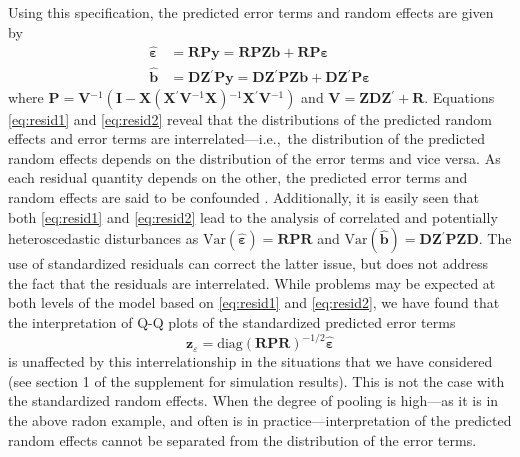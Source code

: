 \documentclass[12pt]{article} %
\newcommand{\al}[1]{{\color{red} #1}}
\newcommand{\inv}{\ensuremath{^{-1}}}
\newcommand{\trans}{\ensuremath{^\prime}}
\newcommand{\var}{\ensuremath{\mathrm{Var}}}
\begin{document}
Using this specification, the predicted error terms and random effects are given by 
%
\begin{align}
\widehat{\bm{\varepsilon}} &= \bm{RPy} = \bm{RPZb} + \bm{RP \varepsilon} \label{eq:resid1}\\
\widehat{\bm{b}} &= \bm{DZ}\trans \bm{Py} = \bm{DZ}\trans \bm{PZb} + \bm{DZ}\trans \bm{P \varepsilon} \label{eq:resid2}
\end{align}
%
where $\bm{P} = \bm{V}\inv( \bm{I} - \bm{X} (\bm{X}\trans \bm{V}\inv \bm{X})\inv \bm{X}\trans \bm{V}\inv)$ \al{and $\bm{V} = \bm{ZDZ}\trans + \bm{R}$}. 
\al{Equations \eqref{eq:resid1} and \eqref{eq:resid2} reveal that the distributions of the predicted random effects and error terms are interrelated---i.e.,~the distribution of  the predicted random effects depends on the distribution of the error terms and vice versa. As each residual quantity depends on the other, the predicted error terms and random effects are said to be confounded  \citep{HildenMinton:1995wh}.}
Additionally, it is easily seen that both \eqref{eq:resid1} and \eqref{eq:resid2} lead to the analysis of correlated and potentially heteroscedastic disturbances as $\var(\widehat{\bm{\varepsilon}}) = \bm{RPR}$ and $\var(\widehat{\bm{b}}) = \bm{DZ}\trans \bm{PZD}$.
The use of standardized residuals can correct the latter issue, but does not address the fact that the residuals are interrelated. While problems may be expected at both levels of the model based on \eqref{eq:resid1} and \eqref{eq:resid2}, we have found that the interpretation of Q-Q plots of the standardized predicted error terms
%
\[
\bm{z}_{\varepsilon} =  \text{diag} \left(\bm{RPR} \right)^{-1/2} \widehat{\bm{\varepsilon}}
\]
%
is unaffected by this interrelationship \al{in the situations that we have considered (see section 1 of the supplement for simulation results). %
} This is not the case with the standardized random effects.  When the degree of pooling is high---as it is in the above radon example, and often is in practice---interpretation of the predicted random effects cannot be separated from the distribution of the error terms. 
\end{document}
